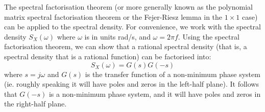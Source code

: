 \documentclass[11pt]{report} %
\begin{document}
The spectral factorisation theorem (or more generally known as the polynomial matrix spectral factorisation theorem or the Fejer-Riesz lemma in the $1\times 1$ case) can be applied to the spectral density. For convenience, we work with the spectral density $S_{X}\left(\omega\right)$ where $\omega$ is in units rad/s, and $\omega = 2\pi f$. Using the spectral factorisation theorem, we can show that a rational spectral density (that is, a spectral density that is a rational function) can be factorised into:
\begin{equation}
S_{X}\left(\omega\right) = G\left(s\right)G\left(-s\right)
\end{equation}
where $s = j\omega$ and $G\left(s\right)$ is the transfer function of a non-minimum phase system (ie. roughly speaking it will have poles and zeros in the left-half plane). It follows that $G\left(-s\right)$ is a non-minimum phase system, and it will have poles and zeros in the right-half plane.
\end{document}
